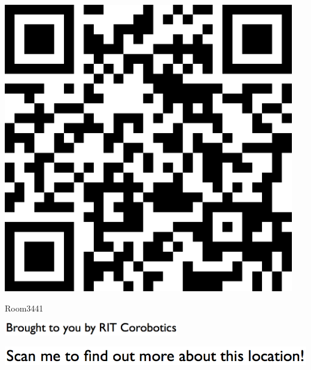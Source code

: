 \documentclass[letterpaper]{article}
\begin{document}
 \begingroup 
 \centerline{\includegraphics[scale=1,width=5in,height=5in]{Room3441.png}} 
 \endgroup 
 \vspace*{\fill} 

 \hfill{\small Room3441} 

  \vspace{0.7in} 
 
 \centerline{\includegraphics[scale=1,width=3in]{text-bottom.png}} 
 
 \pagebreak 
{} 
 \vspace*{\fill} 
 
  \centerline{\includegraphics[scale=1,width=6in]{text-top.png}} 
 
 \vspace{0.5in} 
 
\end{document}
